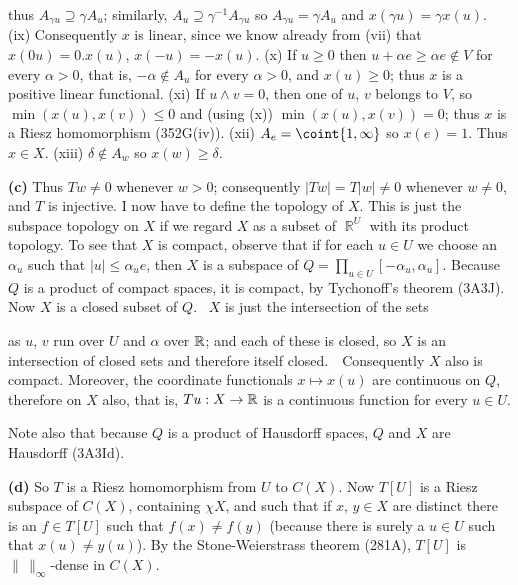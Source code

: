 {
     
\noindent thus $A_{\gamma u}\supseteq\gamma A_u$;  similarly,
$A_u\supseteq\gamma^{-1}A_{\gamma u}$ so $A_{\gamma u}=\gamma A_u$ and
$x(\gamma u)=\gamma x(u)$.   (ix) Consequently $x$ is linear, since we
know already from (vii) that $x(0u)=0.x(u)$, $x(-u)=-x(u)$.   (x) If
$u\ge 0$ then $u+\alpha e\ge\alpha e\notin V$ for every $\alpha>0$, that
is, $-\alpha\notin A_u$ for every $\alpha>0$, and $x(u)\ge 0$;  thus $x$
is a positive linear functional.   (xi) If $u\wedge v=0$, then one of
$u$, $v$ belongs to $V$, so $\min(x(u),x(v))\le 0$ and (using (x))
$\min(x(u),x(v))=0$;  thus $x$ is a Riesz homomorphism (352G(iv)).
(xii) $A_e=\coint{1,\infty}$ so $x(e)=1$.   Thus $x\in X$.   (xiii)
$\delta\notin A_w$ so $x(w)\ge\delta$.\ \Qed
     
\medskip
     
{\bf (c)} Thus $Tw\ne 0$ whenever $w>0$;  consequently $|Tw|=T|w|\ne 0$
whenever $w\ne 0$, and $T$ is injective.   I now
have to define the topology of $X$.   This is just the subspace topology
on $X$ if we regard $X$ as a subset of $\BbbR^U$ with its product
topology.
To see that $X$ is compact, observe that if for each $u\in U$ we choose
an $\alpha_u$ such that $|u|\le\alpha_ue$, then $X$ is a subspace of
$Q=\prod_{u\in U}[-\alpha_u,\alpha_u]$.
Because $Q$ is a product of compact spaces, it is compact, by
Tychonoff's theorem (3A3J).   Now $X$ is a closed subset of $Q$.
\Prf\ $X$ is just the intersection of the sets
     
     
     
\noindent as $u$, $v$ run over $U$ and $\alpha$ over $\Bbb R$;  and each
of these is closed, so $X$ is an intersection of closed sets and
therefore itself closed.\ \QeD\  Consequently $X$ also is compact.
Moreover, the coordinate functionals $x\mapsto x(u)$ are continuous on
$Q$, therefore on $X$ also, that is, $Tu:X\to\Bbb R$ is a continuous
function for every $u\in U$.
     
Note also that because $Q$ is a product of Hausdorff spaces, $Q$ and $X$
are Hausdorff (3A3Id).
     
\medskip
     
{\bf (d)} So $T$ is a Riesz homomorphism from $U$ to $C(X)$.   Now
$T[U]$ is a Riesz subspace of $C(X)$, containing $\chi X$, and such that
if $x$, $y\in X$ are distinct there is an $f\in T[U]$ such that
$f(x)\ne f(y)$ (because there is surely a $u\in U$ such that 
$x(u)\ne y(u)$).   By the Stone-Weierstrass theorem (281A), $T[U]$ is
$\|\,\|_{\infty}$-dense in $C(X)$.
     
}
